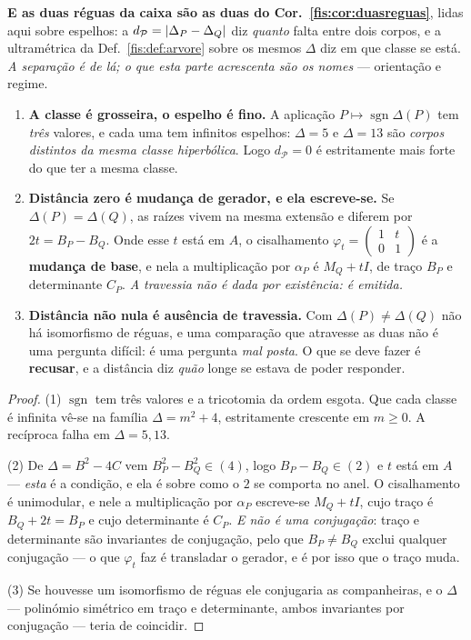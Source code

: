 \documentclass[livro.tex]{subfiles}
\begin{document}
\medskip\noindent\textbf{E as duas réguas da caixa são as duas do
Cor.~\ref{fis:cor:duasreguas}}, lidas aqui sobre espelhos: a
$d_{\mathcal{P}}=\lvert \Delta_P-\Delta_Q\rvert$ diz \emph{quanto} falta entre dois
corpos, e a ultramétrica da Def.~\ref{fis:def:arvore} sobre os mesmos $\Delta$ diz
em que classe se está. \emph{A separação é de lá; o que esta parte acrescenta são
os nomes} --- orientação e regime.

\begin{teorema}\label{fis:thm:pandora}
\begin{enumerate}\itemsep3pt
\item[(1)] \textbf{A classe é grosseira, o espelho é fino.} A aplicação
$P\mapsto\operatorname{sgn}\Delta(P)$ tem \emph{três} valores, e cada uma tem
infinitos espelhos: $\Delta=5$ e $\Delta=13$ são \emph{corpos distintos da mesma
classe hiperbólica}. Logo $d_{\mathcal{P}}=0$ é estritamente mais forte do que ter
a mesma classe.
\item[(2)] \textbf{Distância zero é mudança de gerador, e ela escreve-se.} Se
$\Delta(P)=\Delta(Q)$, as raízes vivem na mesma extensão e diferem por
$2t=B_P-B_Q$. Onde esse $t$ está em $A$, o cisalhamento
$\varphi_t=\left(\begin{smallmatrix}1&t\\0&1\end{smallmatrix}\right)$ é a
\textbf{mudança de base}, e nela a multiplicação por $\alpha_P$ é $M_Q+tI$, de
traço $B_P$ e determinante $C_P$. \emph{A travessia não é dada por existência: é
emitida.}
\item[(3)] \textbf{Distância não nula é ausência de travessia.} Com
$\Delta(P)\neq\Delta(Q)$ não há isomorfismo de réguas, e uma comparação que
atravesse as duas não é uma pergunta difícil: é uma pergunta \emph{mal posta}. O
que se deve fazer é \textbf{recusar}, e a distância diz \emph{quão} longe se
estava de poder responder.
\end{enumerate}
\end{teorema}

\begin{proof}
(1) $\operatorname{sgn}$ tem três valores e a tricotomia da ordem esgota. Que
cada classe é infinita vê-se na família $\Delta=m^{2}+4$, estritamente crescente
em $m\ge0$. A recíproca falha em $\Delta=5,13$.

(2) De $\Delta=B^{2}-4C$ vem $B_P^{2}-B_Q^{2}\in(4)$, logo $B_P-B_Q\in(2)$ e $t$
está em $A$ --- \emph{esta} é a condição, e ela é sobre como o $2$ se comporta no
anel. O cisalhamento é unimodular, e nele a multiplicação por $\alpha_P$
escreve-se $M_Q+tI$, cujo traço é $B_Q+2t=B_P$ e cujo determinante é $C_P$. \emph{E
não é uma conjugação}: traço e determinante são invariantes de conjugação, pelo
que $B_P\neq B_Q$ exclui qualquer conjugação --- o que $\varphi_t$ faz é
transladar o gerador, e é por isso que o traço muda.

(3) Se houvesse um isomorfismo de réguas ele conjugaria as companheiras, e o
$\Delta$ --- polinómio simétrico em traço e determinante, ambos invariantes por
conjugação --- teria de coincidir.
\end{proof}
\end{document}
